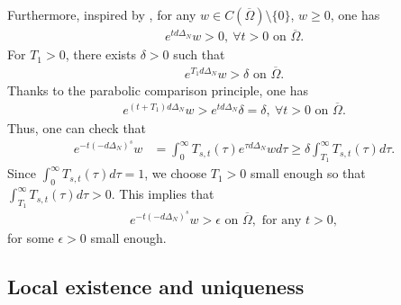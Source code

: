 \documentclass[a4paper,11pt]{amsart}
\theoremstyle{definition}
\def\O{\Omega}
\numberwithin{equation}{section}
\theoremstyle{definition}
\def\O{\Omega}
\begin{document}
Furthermore, inspired by \cite[Proposition 2.7]{zhao_spatiotemporal_2025}, for any $w\in C(\overline{\O})\setminus\{0\}$, $w\geq 0$, one has
\begin{align*}
e^{td\Delta_N}w >0,~\forall t>0 \text{ on }\overline{\O}.
\end{align*}
For $T_1>0$, there exists $\delta>0$ such that
\begin{align*}
e^{T_1d\Delta_N}w>\delta \text{ on }\overline{\O}.
\end{align*}
Thanks to the parabolic comparison principle, one has
\begin{align*}
e^{(t+T_1)d\Delta_N}w>e^{td\Delta_N}\delta=\delta,~\forall t>0 \text{ on }\overline{\O}.
\end{align*}
Thus, one can check that
\begin{align*}
e^{-t(-d\Delta_N)^s}w&=\int_0^{\infty}T_{s,t}(\tau)e^{\tau d\Delta_N}wd\tau\geq \delta \int_{T_1}^{\infty}T_{s,t}(\tau) d\tau.
\end{align*}
Since $\displaystyle\int_{0}^{\infty}T_{s,t}(\tau) d\tau=1$, we choose $T_1>0$ small enough so that $\displaystyle\int_{T_1}^{\infty}T_{s,t}(\tau) d\tau>0$. This implies that \begin{align*}
e^{-t(-d\Delta_N)^s}w>\epsilon \text{ on }\overline{\O}, \text{ for any }t>0,
\end{align*}
for some $\epsilon>0$ small enough.


\subsection{\bf Local existence and uniqueness}
\end{document}
